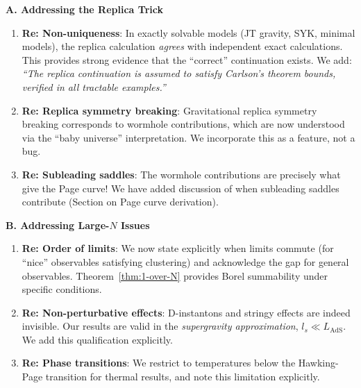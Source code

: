 \documentclass[12pt,a4paper]{article}
\begin{document}
\begin{tcolorbox}[colback=blue!5!white, colframe=blue!75!black, title=\textbf{BLUE TEAM Round 2: Technical Responses}]

\textbf{A. Addressing the Replica Trick}

\begin{enumerate}[label=\textbf{B2.\arabic*.}]
    \item \textbf{Re: Non-uniqueness}: In exactly solvable models (JT gravity, SYK, minimal models), the replica calculation \emph{agrees} with independent exact calculations. This provides strong evidence that the ``correct'' continuation exists. We add: \emph{``The replica continuation is assumed to satisfy Carlson's theorem bounds, verified in all tractable examples.''}
    
    \item \textbf{Re: Replica symmetry breaking}: Gravitational replica symmetry breaking corresponds to wormhole contributions, which are now understood via the ``baby universe'' interpretation. We incorporate this as a feature, not a bug.
    
    \item \textbf{Re: Subleading saddles}: The wormhole contributions are precisely what give the Page curve! We have added discussion of when subleading saddles contribute (Section on Page curve derivation).
\end{enumerate}

\textbf{B. Addressing Large-$N$ Issues}

\begin{enumerate}[resume, label=\textbf{B2.\arabic*.}]
    \item \textbf{Re: Order of limits}: We now state explicitly when limits commute (for ``nice'' observables satisfying clustering) and acknowledge the gap for general observables. Theorem~\ref{thm:1-over-N} provides Borel summability under specific conditions.
    
    \item \textbf{Re: Non-perturbative effects}: D-instantons and stringy effects are indeed invisible. Our results are valid in the \emph{supergravity approximation}, $l_s \ll L_{\text{AdS}}$. We add this qualification explicitly.
    
    \item \textbf{Re: Phase transitions}: We restrict to temperatures below the Hawking-Page transition for thermal results, and note this limitation explicitly.
\end{enumerate}


\end{tcolorbox}
\end{document}
